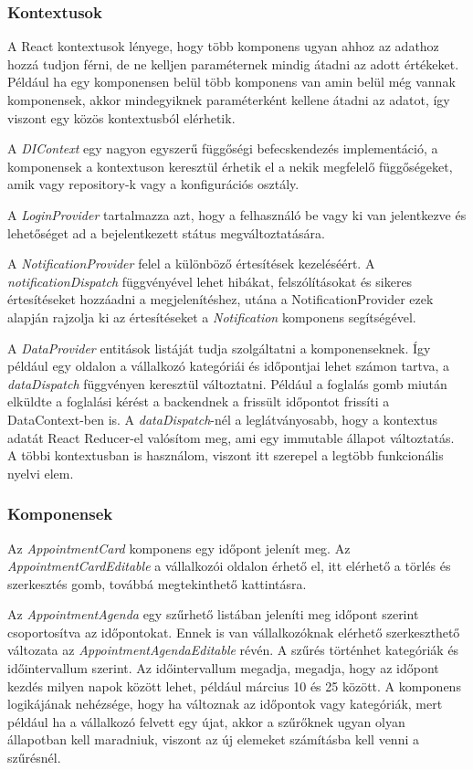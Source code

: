 \subsubsection{Kontextusok}

A React kontextusok lényege, hogy több komponens ugyan ahhoz az adathoz hozzá tudjon férni, de ne kelljen paraméternek mindig átadni az adott értékeket. Például ha egy komponensen belül több komponens van amin belül még vannak komponensek, akkor mindegyiknek paraméterként kellene átadni az adatot, így viszont egy közös kontextusból elérhetik.

A \textit{DIContext} egy nagyon egyszerű függőségi befecskendezés implementáció, a komponensek a kontextuson keresztül érhetik el a nekik megfelelő függőségeket, amik vagy repository-k vagy a konfigurációs osztály.

A \textit{LoginProvider} tartalmazza azt, hogy a felhasználó be vagy ki van jelentkezve és lehetőséget ad a bejelentkezett státus megváltoztatására.

A \textit{NotificationProvider} felel a különböző értesítések kezeléséért. A \textit{notificationDispatch} függvényével lehet hibákat, felszólításokat és sikeres értesítéseket hozzáadni a megjelenítéshez, utána a NotificationProvider ezek alapján rajzolja ki az értesítéseket a \textit{Notification} komponens segítségével.

A \textit{DataProvider} entitások listáját tudja szolgáltatni a komponenseknek. Így például egy oldalon a vállalkozó kategóriái és időpontjai lehet számon tartva, a \textit{dataDispatch} függvényen keresztül változtatni. Például a foglalás gomb miután elküldte a foglalási kérést a backendnek a frissült időpontot frissíti a DataContext-ben is. A \textit{dataDispatch}-nél a leglátványosabb, hogy a kontextus adatát  React Reducer-el valósítom meg, ami egy immutable állapot változtatás. A többi kontextusban is használom, viszont itt szerepel a legtöbb funkcionális nyelvi elem. 

\subsubsection{Komponensek}

Az \textit{AppointmentCard} komponens egy időpont jelenít meg. Az \textit{AppointmentCardEditable} a vállalkozói oldalon érhető el, itt elérhető a törlés és szerkesztés gomb, továbbá megtekinthető kattintásra.

Az \textit{AppointmentAgenda} egy szűrhető listában jeleníti meg időpont szerint csoportosítva az időpontokat. Ennek is van vállalkozóknak elérhető szerkeszthető változata az \textit{AppointmentAgendaEditable} révén. A szűrés történhet kategóriák és időintervallum szerint. Az időintervallum megadja, megadja, hogy az időpont kezdés milyen napok között lehet, például március 10 és 25 között. A komponens logikájának nehézsége, hogy ha változnak az időpontok vagy kategóriák, mert például ha a vállalkozó felvett egy újat, akkor a szűrőknek ugyan olyan állapotban kell maradniuk, viszont az új elemeket számításba kell venni a szűrésnél.


